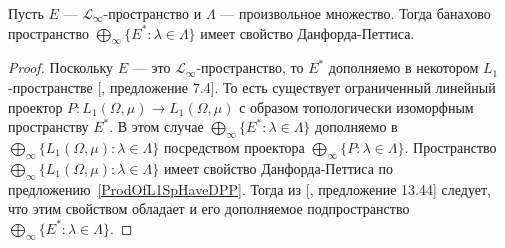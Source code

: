 \begin{proposition}\label{ProdOfDualsOfMthscrLInftySpHaveDPP} Пусть $E$ ---
$\mathscr{L}_\infty$-пространство и $\Lambda$ --- произвольное множество. Тогда
банахово пространство $\bigoplus_\infty \{E^*:\lambda\in\Lambda \}$ имеет
свойство Данфорда-Петтиса.
\end{proposition}
\begin{proof} Поскольку $E$ --- это $\mathscr{L}_\infty$-пространство, то $E^*$
дополняемо в некотором $L_1$-пространстве [\cite{LinPelAbsSumOpInLpSpAndApp},
предложение 7.4]. То есть существует ограниченный линейный проектор
$P:L_1(\Omega,\mu)\to L_1(\Omega,\mu)$ с образом топологически изоморфным
пространству $E^*$. В этом случае $\bigoplus_\infty \{ E^*:\lambda\in\Lambda \}$
дополняемо в $\bigoplus_\infty \{ L_1(\Omega,\mu):\lambda\in\Lambda \}$
посредством проектора $\bigoplus_\infty \{P:\lambda\in\Lambda \}$. Пространство
$\bigoplus_\infty \{ L_1(\Omega,\mu):\lambda\in\Lambda \}$ имеет свойство
Данфорда-Петтиса по предложению~\ref{ProdOfL1SpHaveDPP}. Тогда из
[\cite{FabHabBanSpTh}, предложение 13.44] следует, что этим свойством обладает и
его дополняемое подпространство $\bigoplus_\infty \{ E^*:\lambda\in\Lambda \}$.
\end{proof}

